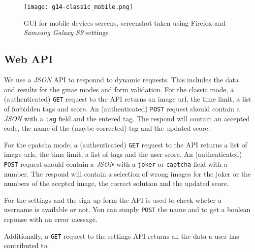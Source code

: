 \begin{figure}[!]
\centering
\texttt{[image: g14-classic\_mobile.png]}
\caption{GUI for mobile devices screens, screenshot taken using Firefox and \textit{Samsung Galaxy S9} settings}
\label{g14:fig:guiclassicmobile}
\end{figure}


\subsection{Web API}
\label{g14:sec:implementation:API}
We use a \textit{JSON} API to responnd to dynamic requests. This includes the data and results for the gmae modes and form validation.
For the classic mode, a (authenticated) \texttt{GET} request to the API returns an image url, the time limit, a list of forbidden tags and score.
An (authenticated) \texttt{POST} request should contain a \textit{JSON} with a \texttt{tag} field and the entered tag. The respond will contain an accepted code, the name of the (maybe corrected) tag and the updated score.

For the cpatcha mode, a (authenticated) \texttt{GET} request to the API returns a list of image urls, the time limit, a list of tags and the user score.
An (authenticated) \texttt{POST} request should contain a \textit{JSON} with a \texttt{joker} or \texttt{captcha} field with a number. The respond will contain a selection of wrong images for the joker or the numbers of the accpted image, the correct solution and the updated score.

For the settings and the sign up form the API is used to check wheter a username is available or not. You can simply \texttt{POST} the name and to get a boolean reponse with an error message.

Additionally, a \texttt{GET} request to the settings API returns all the data a user has contributed to.
